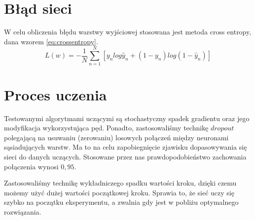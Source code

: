 \section{Błąd sieci}
W celu obliczenia błędu warstwy wyjściowej stosowana jest metoda cross entropy, dana wzorem \ref{eq:crossentropy}.
\begin{equation} \label{eq:crossentropy}
L(w) = -\frac{1}{N} \sum\limits_{n=1}^N [y_nlog\hat{y}_n + (1-y_n)log(1-\hat{y}_n)]
\end{equation}

\section{Proces uczenia}
Testowanymi algorytmami uczącymi są stochastyczny spadek gradientu oraz jego modyfikacja wykorzystująca pęd. Ponadto, zastosowaliśmy technikę $dropout$ polegającą na usuwaniu (zerowaniu) losowych połączeń między neuronami sąsiadujących warstw. Ma to na celu zapobiegnięcie zjawisku dopasowywania się sieci do danych uczących. Stosowane przez nas prawdopodobieństwo zachowania połączenia wynosi $0,95$. 

Zastosowaliśmy technikę wykładniczego spadku wartości kroku, dzięki czemu możemy użyć dużej wartości początkowej kroku. Sprawia to, że sieć uczy się szybko na początku eksperymentu, a zwalnia gdy jest w pobliżu optymalnego rozwiązania.